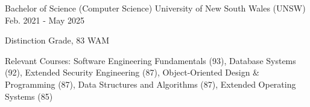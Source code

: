 

\begin{cventries}

  \cventry
    {Bachelor of Science (Computer Science)} %
    {University of New South Wales (UNSW)} %
    {Feb. 2021 - May 2025} %
    {} %
    {
      \begin{cvitems}
        \item {Distinction Grade, 83 WAM}
        \item {Relevant Courses: Software Engineering Fundamentals (93), Database Systems (92), Extended Security Engineering (87), Object-Oriented Design \& Programming (87), Data Structures and Algorithms (87), Extended Operating Systems (85)}
      \end{cvitems}
    }

\end{cventries}
